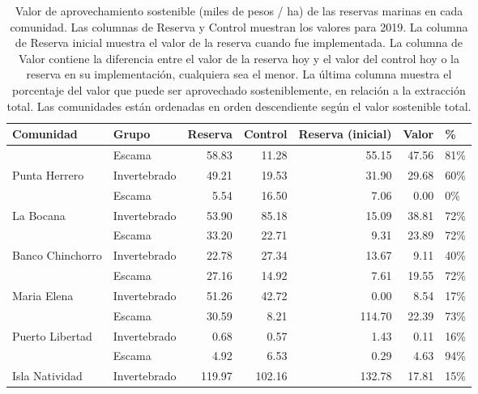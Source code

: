 \begin{table}[!h]

\caption{\label{tab:sust_val}Valor de aprovechamiento sostenible (miles de pesos / ha) de las reservas marinas en cada comunidad. Las columnas de Reserva y Control muestran los valores para 2019. La columna de Reserva inicial muestra el valor de la reserva cuando fue implementada. La columna de Valor contiene la diferencia entre el valor de la reserva hoy y el valor del control hoy o la reserva en su implementación, cualquiera sea el menor. La última columna muestra el porcentaje del valor que puede ser aprovechado sosteniblemente, en relación a la extracción total. Las comunidades están ordenadas en orden descendiente según el valor sostenible total.}
\centering
\begin{tabular}[t]{llrrrrl}
\toprule
Comunidad & Grupo & Reserva & Control & Reserva (inicial) & Valor & \%\\
\midrule
 & Escama & 58.83 & 11.28 & 55.15 & 47.56 & 81\%\\
\cmidrule{2-7}
\multirow{-2}{*}{\raggedright\arraybackslash Punta Herrero} & Invertebrado & 49.21 & 19.53 & 31.90 & 29.68 & 60\%\\
\cmidrule{1-7}
 & Escama & 5.54 & 16.50 & 7.06 & 0.00 & 0\%\\
\cmidrule{2-7}
\multirow{-2}{*}{\raggedright\arraybackslash La Bocana} & Invertebrado & 53.90 & 85.18 & 15.09 & 38.81 & 72\%\\
\cmidrule{1-7}
 & Escama & 33.20 & 22.71 & 9.31 & 23.89 & 72\%\\
\cmidrule{2-7}
\multirow{-2}{*}{\raggedright\arraybackslash Banco Chinchorro} & Invertebrado & 22.78 & 27.34 & 13.67 & 9.11 & 40\%\\
\cmidrule{1-7}
 & Escama & 27.16 & 14.92 & 7.61 & 19.55 & 72\%\\
\cmidrule{2-7}
\multirow{-2}{*}{\raggedright\arraybackslash Maria Elena} & Invertebrado & 51.26 & 42.72 & 0.00 & 8.54 & 17\%\\
\cmidrule{1-7}
 & Escama & 30.59 & 8.21 & 114.70 & 22.39 & 73\%\\
\cmidrule{2-7}
\multirow{-2}{*}{\raggedright\arraybackslash Puerto Libertad} & Invertebrado & 0.68 & 0.57 & 1.43 & 0.11 & 16\%\\
\cmidrule{1-7}
 & Escama & 4.92 & 6.53 & 0.29 & 4.63 & 94\%\\
\cmidrule{2-7}
\multirow{-2}{*}{\raggedright\arraybackslash Isla Natividad} & Invertebrado & 119.97 & 102.16 & 132.78 & 17.81 & 15\%\\

\end{tabular}
\end{table}
